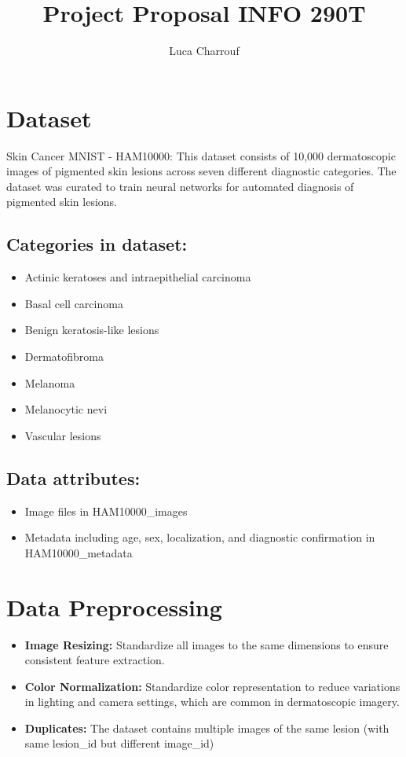 \documentclass{article}
\title{Project Proposal INFO 290T}
\author{Luca Charrouf}
\date{}
\begin{document}
\maketitle

\section*{Dataset}
Skin Cancer MNIST - HAM10000: This dataset consists of 10,000 dermatoscopic images of
pigmented skin lesions across seven different diagnostic categories. The dataset was
curated to train neural networks for automated diagnosis of pigmented skin lesions.

\subsection*{Categories in dataset:}
\begin{itemize}
    \item Actinic keratoses and intraepithelial carcinoma
    \item Basal cell carcinoma
    \item Benign keratosis-like lesions
    \item Dermatofibroma
    \item Melanoma
    \item Melanocytic nevi
    \item Vascular lesions
\end{itemize}

\subsection*{Data attributes:}
\begin{itemize}
    \item Image files in HAM10000\_images
    \item Metadata including age, sex, localization, and diagnostic confirmation in
    HAM10000\_metadata
\end{itemize}

\section*{Data Preprocessing}
\begin{itemize}
    \item \textbf{Image Resizing:} Standardize all images to the same dimensions to ensure
    consistent feature extraction.
    \item \textbf{Color Normalization:} Standardize color representation to reduce variations in
    lighting and camera settings, which are common in dermatoscopic imagery.
    \item \textbf{Duplicates:} The dataset contains multiple images of the same lesion (with same
    lesion\_id but different image\_id)
\end{itemize}
\end{document}
